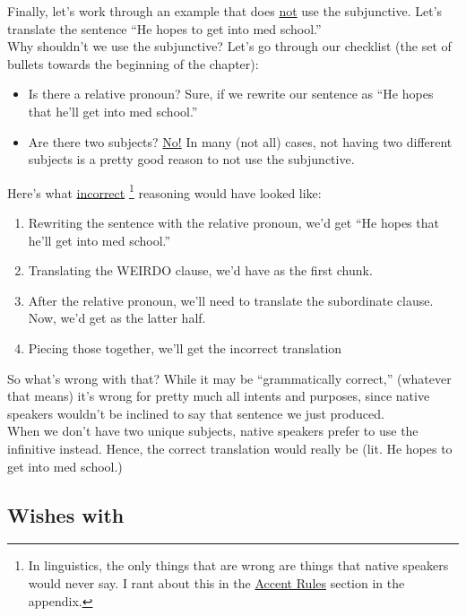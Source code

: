 Finally, let's work through an example that does \underline{not} use the subjunctive. Let's translate the sentence ``He hopes to get into med school.'' \\

Why shouldn't we use the subjunctive? Let's go through our checklist (the set of bullets towards the beginning of the chapter):
\begin{itemize}[noitemsep]
	\item Is there a relative pronoun? Sure, if we rewrite our sentence as ``He hopes that he'll get into med school.''
	\item Are there two subjects? \underline{No!} In many (not all) cases, not having two different subjects is a pretty good reason to not use the subjunctive.
\end{itemize}

Here's what \underline{incorrect} \footnote{In linguistics, the only things that are wrong are things that native speakers would never say. I rant about this in the \hyperref[subsec:accents]{Accent Rules} section in the appendix.} reasoning would have looked like: 
\begin{enumerate}
	\item Rewriting the sentence with the relative pronoun, we'd get ``He hopes that he'll get into med school.''
	\item Translating the WEIRDO clause, we'd have  as the first chunk.
	\item After the relative pronoun, we'll need to translate the subordinate clause. Now, we'd get  as the latter half.
	\item Piecing those together, we'll get the incorrect translation 
\end{enumerate}

So what's wrong with that? While it may be ``grammatically correct,'' (whatever that means) it's wrong for pretty much all intents and purposes, since native speakers wouldn't be inclined to say that sentence we just produced. \\

When we don't have two unique subjects, native speakers prefer to use the infinitive instead. Hence, the correct translation would really be  (lit. He hopes to get into med school.)\\

\subsection{Wishes with }

